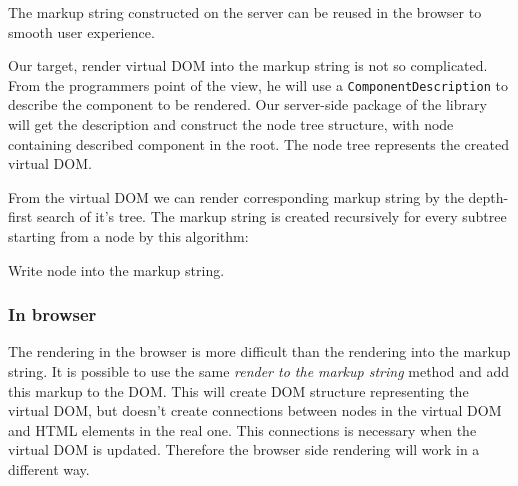 \documentclass[oneside, 12pt]{book}
\begin{document}
      The markup string constructed on the server can be reused in the browser to smooth user experience. 

      Our target, render virtual DOM into the markup string is not so complicated.
      From the programmers point of the view, 
      he will use a \texttt{ComponentDescription} to describe the component to be rendered.
      Our server-side package of the library will get the description and construct the node tree structure, 
      with node containing described component in the root. 
      The node tree represents the created virtual DOM. 

      From the virtual DOM we can render corresponding markup string by the depth-first search of it's tree. 
      The markup string is created recursively for every subtree starting from a node by this algorithm:

      \begin{algorithm}[H]
        \caption{Write node into the markup string.}
      \end{algorithm}

    \subsubsection{In browser}\label{subsec:our-architecture-rendering-browser}

      The rendering in the browser is more difficult than the rendering into the markup string. 
      It is possible to use the same \textit{render to the markup string} method and add this markup to the DOM. 
      This will create DOM structure representing the virtual DOM, 
      but doesn't create connections between nodes in the virtual DOM and HTML elements in the real one. 
      This connections is necessary when the virtual DOM is updated.
      Therefore the browser side rendering will work in a different way. 
\end{document}
